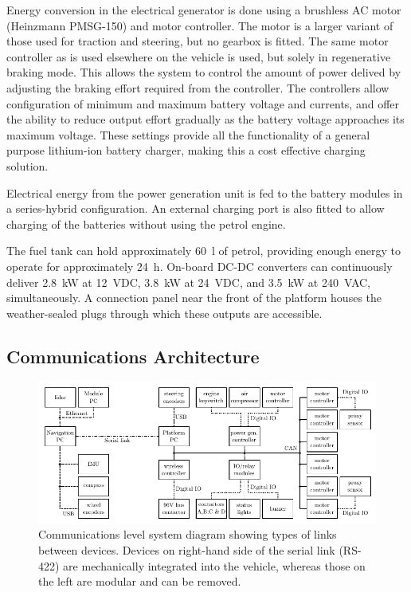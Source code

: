 \documentclass[preprint,authoryear,12pt]{elsarticle}
\begin{document}
        Energy conversion in the electrical generator is done using a brushless AC motor (Heinzmann PMSG-150) and motor controller.
        The motor is a larger variant of those used for traction and steering, but no gearbox is fitted.
        The same motor controller as is used elsewhere on the vehicle is used, but solely in regenerative braking mode.
        This allows the system to control the amount of power delived by adjusting the braking effort required from the controller.
        The controllers allow configuration of minimum and maximum battery voltage and currents, and offer the ability to reduce output effort gradually as the battery voltage approaches its maximum voltage.
        These settings provide all the functionality of a general purpose lithium-ion battery charger, making this a cost effective charging solution.

        Electrical energy from the power generation unit is fed to the battery modules in a series-hybrid configuration.
        An external charging port is also fitted to allow charging of the batteries without using the petrol engine.

        The fuel tank can hold approximately \SI{60}{\litre} of petrol, providing enough energy to operate for approximately \SI{24}{\hour}.
        On-board DC-DC converters can continuously deliver \SI{2.8}{\kilo\watt} at \SI{12}{\volt}DC, \SI{3.8}{\kilo\watt} at \SI{24}{\volt}DC, and \SI{3.5}{\kilo\watt} at \SI{240}{\volt}AC, simultaneously.
        A connection panel near the front of the platform houses the weather-sealed plugs through which these outputs are accessible.


    \subsection{Communications Architecture}
    \label{sect:architecture}

        \begin{figure}[htb]
            \centering
            \includegraphics[width=\linewidth]{imgs/system_diagram/diagram_v5.pdf}
            \caption{
                Communications level system diagram showing types of links between devices.
                Devices on right-hand side of the serial link (RS-422) are mechanically integrated into the vehicle, whereas those on the left are modular and can be removed.
            }
            \label{fig:system_diagram}
        \end{figure}
\end{document}
